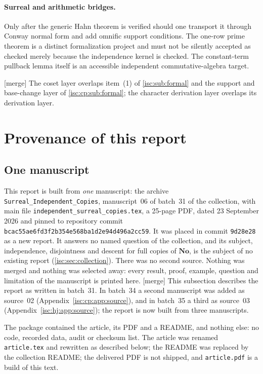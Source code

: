 \documentclass[11pt,letterpaper]{article}
\theoremstyle{definition}
\theoremstyle{remark}
\newcommand{\No}{\mathbf{No}}
\newcommand{\mtag}{\textup{[merge]}}%
\numberwithin{equation}{section}
\begin{document}
\paragraph{Surreal and arithmetic bridges.}
Only after the generic Hahn theorem is verified should one transport
it through Conway normal form and add omnific support conditions.
The one-row prime theorem is a distinct formalization project and must
not be silently accepted as checked merely because the independence
kernel is checked. The constant-term pullback lemma itself is an
accessible independent commutative-algebra target.

\mtag{} The coset layer overlaps item~(1) of \cref{isc:sub:formal} and the
support and base-change layer of \cref{isc:cp:sub:formal}; the character
derivation layer overlaps its derivation layer.

\appendix
\section{Provenance of this report}\label{isc:app:report}

\subsection{One manuscript}\label{isc:app:onesource}

This report is built from \emph{one} manuscript: the archive
\texttt{Surreal\_Independent\_Copies}, manuscript~06 of batch~31 of the
collection, with main file \texttt{independent\_surreal\_copies.tex}, a
25-page PDF, dated 23 September 2026 and pinned to repository commit
\nolinkurl{bcac55ae6fd3f2b354e568ba1d2e94d496a2cc59}. It was placed in
commit \texttt{9d28e28} as a new report. It answers no named question of
the collection, and its subject, independence, disjointness and descent
for full copies of $\No$, is the subject of no existing report
(\cref{isc:sec:collection}). There was no second source. Nothing was
merged and nothing was selected away: every result, proof, example,
question and limitation of the manuscript is printed here.
\mtag{} This subsection describes the report as written in batch~31. In
batch~34 a second manuscript was added as source~02
(Appendix~\ref{isc:cp:app:source}), and in batch~35 a third as source~03
(Appendix~\ref{isc:hj:app:source}); the report is now built from three
manuscripts.

The package contained the article, its PDF and a README, and nothing else:
no code, recorded data, audit or checksum list. The article was renamed
\texttt{article.tex} and rewritten as described below; the README was
replaced by the collection README; the delivered PDF is not shipped, and
\texttt{article.pdf} is a build of this text.
\end{document}
